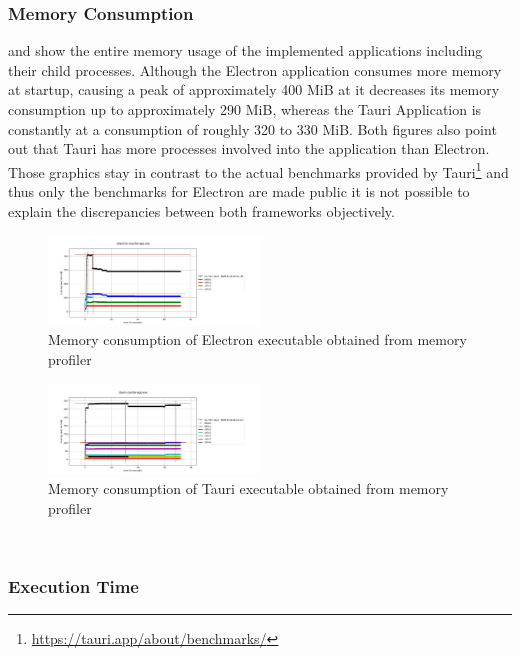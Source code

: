 \subsubsection{Memory Consumption}
\label{subsubsec:perf:memory}
 and  show the entire memory usage of the implemented applications including their child processes.
Although the Electron application consumes more memory at startup, causing a peak of approximately 400 MiB at  it decreases its memory consumption up to approximately 290 MiB,
whereas the Tauri Application is constantly at a consumption of roughly 320 to 330 MiB\@.
Both figures also point out that Tauri has more processes involved into the application than Electron.
Those graphics stay in contrast to the actual benchmarks provided by Tauri\footnote{\url{https://tauri.app/about/benchmarks/}} and thus only the benchmarks for Electron are made public it is not possible to explain the discrepancies between both frameworks objectively.
\begin{figure}[ht]
    \centering
    \includegraphics[width=0.5\textwidth]{images/ElectronMemCons}
    \caption[]{Memory consumption of Electron executable obtained from memory profiler}
    \label{fig:electron:memory}
\end{figure}
\begin{figure}[ht]
    \centering
    \includegraphics[width=0.5\textwidth]{images/TauriMemCons}
    \caption[]{Memory consumption of Tauri executable obtained from memory profiler}
    \label{fig:tauri:memory}
\end{figure}
\\
\subsubsection{Execution Time}
\label{subsubsec:perf:execution}

